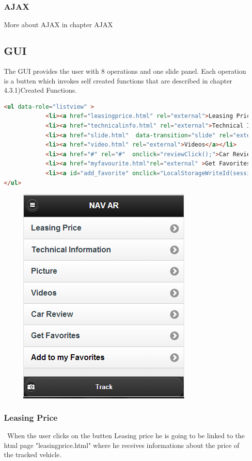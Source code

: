 \subsubsection{AJAX}
More about AJAX in chapter AJAX
\\

\subsection{GUI}
The GUI provides the user with 8 operations and one slide panel. Each operation is a butten which invokes self created functions that are described in chapter 4.3.1)Created Functions.
\\
\begin{lstlisting}[language=html, caption= 
start timer function,captionpos=b]
<ul data-role="listview" >	
            <li><a href="leasingprice.html" rel="external">Leasing Price</a></li>
            <li><a href="technicalinfo.html" rel="external">Technical Information</a></li>
            <li><a href="slide.html"  data-transition="slide" rel="external">Picture</a></li>
            <li><a href="video.html" rel="external">Videos</a></li>
            <li><a href="#" rel="#"  onclick="reviewClick();">Car Review</a></li>
            <li><a href="myfavourite.html"rel="external" >Get Favorites</a></li>
			<li><a id="add_favorite" onclick="LocalStorageWriteId(sessionStorage.getItem('id'),globalcarname);" style="color:red" rel="external" >Add to my Favorites</a></li>
</ul>
\end{lstlisting}


\begin{figure}[H]
\centering
\includegraphics[width=0.4\linewidth]{graphics/chapter4/4}
\caption{}
\label{fig:5}
\end{figure}
\newpage

\subsubsection{Leasing Price}
\
When the user clicks on the butten Leasing price he is going to be linked to the html page "leasingprice.html" where he receives informations about the price of the tracked vehicle.

